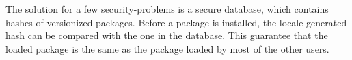 




The solution for a few security-problems is a secure database, which contains hashes of versionized packages. Before a package is installed, the locale generated hash can be compared with the one in the database. This guarantee that the loaded package is the same as the package loaded by most of the other users.

